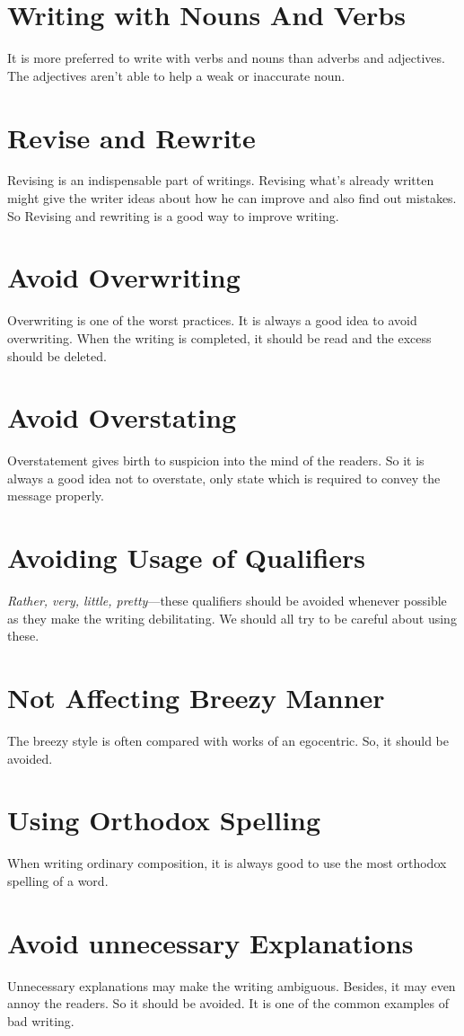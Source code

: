 \documentclass[12pt]{report}
\begin{document}
\section{Writing with Nouns And Verbs}
It is more preferred to write with verbs and nouns than adverbs and adjectives. The adjectives aren't able to help a weak or inaccurate noun.
\section{Revise and Rewrite}
Revising is an indispensable part of writings. Revising what's already written might give the writer ideas about how he can improve and also find out mistakes. So Revising and rewriting is a good way to improve writing.
\section{Avoid Overwriting}
Overwriting is one of the worst practices. It is always a good idea to avoid overwriting. When the writing is completed, it should be read and the excess should be deleted.
\section{Avoid Overstating}
Overstatement gives birth to suspicion into the mind of the readers. So it is always a good idea not to overstate, only state which is required to convey the message properly.
\section{Avoiding Usage of Qualifiers}
\textit{Rather, very, little, pretty}---these qualifiers should be avoided whenever possible as they make the writing debilitating. We should all try to be careful about using these.
\section{Not Affecting Breezy Manner}
The breezy style is often compared with works of an egocentric. So, it should be avoided.
\section{Using Orthodox Spelling}
When writing ordinary composition, it is always good to use the most orthodox spelling of a word.
\section{Avoid unnecessary Explanations}
Unnecessary explanations may make the writing ambiguous. Besides, it may even annoy the readers. So it should be avoided. It is one of the common examples of bad writing.
\end{document}
